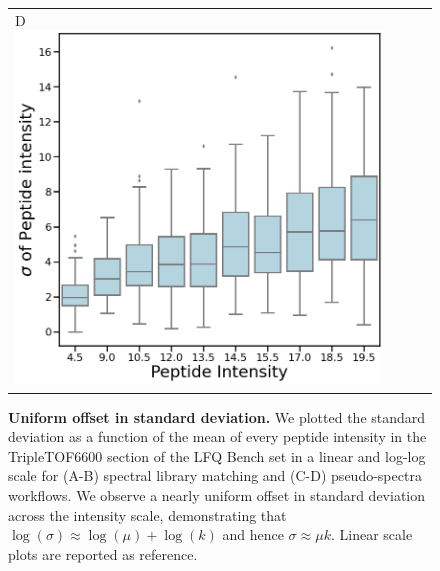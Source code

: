 \documentclass[11pt]{article}
\begin{document}
\begin{figure}[hbt]
\begin{tabular}{lclc}
        D \includegraphics[width=0.5\linewidth]{../../result/mu_sigma_variance_plots/diann/diann_boxplot_nolog_qvalFiltered_pepFiltered_qbinned.png} & \\%
    \end{tabular}
  \caption{{\bf Uniform offset in standard deviation.} We plotted the standard deviation as a function of the mean of every peptide intensity in the TripleTOF6600 section of the LFQ Bench set  in a linear and log-log scale for (A-B) spectral library matching and (C-D) pseudo-spectra workflows.  We observe a nearly uniform offset in standard deviation across the intensity scale, demonstrating that $\log(\sigma) \approx \log(\mu) + \log(k)$ and hence   $\sigma \approx \mu k$. Linear scale plots are reported as reference.  \label{fig:mu_sigma_boxplot}}
\end{figure}
\end{document}
